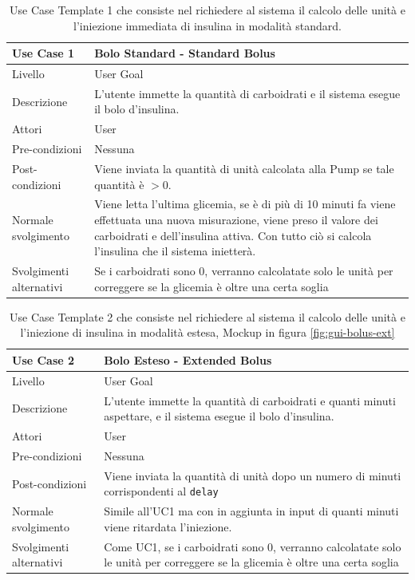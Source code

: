 \documentclass[twocolumn]{article}
\begin{document}
\null\vfill
\begin{table}[!htbp]
\centering
\captionsetup{justification=centering}
\begin{tabular}{|p{4.5cm}|p{9.5cm}|}
    \hline
    Use Case 1 & Bolo Standard - Standard Bolus\\
    \hline
    Livello & User Goal \\
    \hline
    Descrizione & L'utente immette la quantità di carboidrati e il sistema esegue il bolo d'insulina.\\
    \hline
    Attori & User \\
    \hline
    Pre-condizioni & Nessuna\\
    \hline
    Post-condizioni & Viene inviata la quantità di unità calcolata alla Pump se tale quantità è $> 0$.\\
    \hline
    Normale svolgimento & Viene letta l'ultima glicemia, se è di più di 10 minuti fa viene effettuata una nuova misurazione, viene preso il valore dei carboidrati e dell'insulina attiva. Con tutto ciò si calcola l'insulina che il sistema inietterà.\\
    \hline
    Svolgimenti alternativi & Se i carboidrati sono 0, verranno calcolatate solo le unità per correggere se la glicemia è oltre una certa soglia \\
    \hline
\end{tabular}
\caption{Use Case Template 1 che consiste nel richiedere al sistema il calcolo delle unità e l'iniezione immediata di insulina in modalità standard.}
\label{tab:uc1}
\end{table}
\vfill\null

\begin{table}
    \centering
    \captionsetup{justification=centering}
    \begin{tabular}{|p{4.5cm}|p{9.5cm}|}
        \hline
        Use Case 2 & Bolo Esteso - Extended Bolus\\
        \hline
        Livello & User Goal \\
        \hline
        Descrizione & L'utente immette la quantità di carboidrati e quanti minuti aspettare, e il sistema esegue il bolo d'insulina.\\
        \hline
        Attori & User \\
        \hline
        Pre-condizioni & Nessuna\\
        \hline
        Post-condizioni & Viene inviata la quantità di unità dopo un numero di minuti corrispondenti al \texttt{delay} \\
        \hline
        Normale svolgimento & Simile all'UC1 ma con in aggiunta in input di quanti minuti viene ritardata l'iniezione.\\
        \hline
        Svolgimenti alternativi & Come UC1, se i carboidrati sono 0, verranno calcolatate solo le unità per correggere se la glicemia è oltre una certa soglia \\
        \hline
    \end{tabular}
    \caption{Use Case Template 2 che consiste nel richiedere al sistema il calcolo delle unità e l'iniezione di insulina in modalità estesa, Mockup in figura \ref{fig:gui-bolus-ext}}
    \label{tab:uc2}
\end{table}
\end{document}
